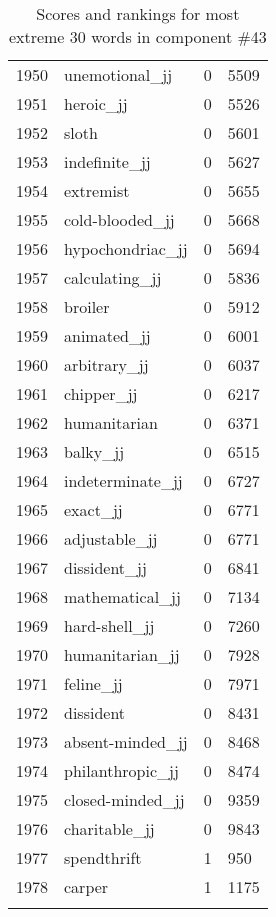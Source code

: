 \begin{longtable}[!htbp]{| rlr@{.}l |}
    1950 & unemotional\_jj & 0 & 5509 \\
    1951 & heroic\_jj & 0 & 5526 \\
    1952 & sloth & 0 & 5601 \\
    1953 & indefinite\_jj & 0 & 5627 \\
    1954 & extremist & 0 & 5655 \\
    1955 & cold-blooded\_jj & 0 & 5668 \\
    1956 & hypochondriac\_jj & 0 & 5694 \\
    1957 & calculating\_jj & 0 & 5836 \\
    1958 & broiler & 0 & 5912 \\
    1959 & animated\_jj & 0 & 6001 \\
    1960 & arbitrary\_jj & 0 & 6037 \\
    1961 & chipper\_jj & 0 & 6217 \\
    1962 & humanitarian & 0 & 6371 \\
    1963 & balky\_jj & 0 & 6515 \\
    1964 & indeterminate\_jj & 0 & 6727 \\
    1965 & exact\_jj & 0 & 6771 \\
    1966 & adjustable\_jj & 0 & 6771 \\
    1967 & dissident\_jj & 0 & 6841 \\
    1968 & mathematical\_jj & 0 & 7134 \\
    1969 & hard-shell\_jj & 0 & 7260 \\
    1970 & humanitarian\_jj & 0 & 7928 \\
    1971 & feline\_jj & 0 & 7971 \\
    1972 & dissident & 0 & 8431 \\
    1973 & absent-minded\_jj & 0 & 8468 \\
    1974 & philanthropic\_jj & 0 & 8474 \\
    1975 & closed-minded\_jj & 0 & 9359 \\
    1976 & charitable\_jj & 0 & 9843 \\
    1977 & spendthrift & 1 & 950 \\
    1978 & carper & 1 & 1175 \\
    \hline
    \caption{Scores and rankings for most extreme 30 words in component \#43} \\
\end{longtable}
